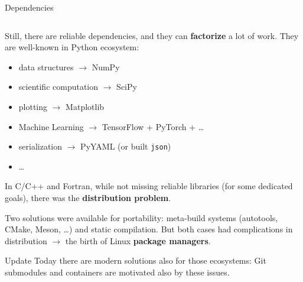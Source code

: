 \documentclass[9pt]{beamer}
\begin{document}
\begin{frame}{Dependencies}
\begin{columns}
\begin{column}{0.5\textwidth}
            Still, there are reliable dependencies, and they can
            \alert{\textbf{factorize}} a lot of work.
            They are well-known in Python ecosystem:
            \begin{itemize}
                \item data structures $\to$ NumPy 
                \item scientific computation $\to$ SciPy
                \item plotting $\to$ Matplotlib
                \item Machine Learning $\to$ TensorFlow + PyTorch + \dots
                \item serialization $\to$ PyYAML (or built \texttt{json})
                \item \dots
            \end{itemize}

            In C/C++ and Fortran, while not missing reliable libraries (for
            some dedicated goals), there was the \textbf{distribution problem}.

            Two solutions were available for portability: meta-build systems
            (autotools, CMake, Meson, \dots) and static compilation.
            But both cases had complications in distribution $\to$ the birth of
            Linux \textbf{package managers}.

            \begin{block}{Update}
                Today there are modern solutions also for those ecosystems: Git
                submodules and containers are motivated also by these issues.
            \end{block}
        \end{column}
    \end{columns}
\end{frame}
\end{document}
